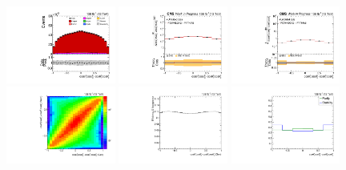 \begin{refsection}
\clearpage
\begin{figure}[htb]
\begin{center}
 \includegraphics[width=0.32\textwidth]{fig_fullRun2UL/controlplots/combined/Hyp_LLBarCMnk.pdf}
 \includegraphics[width=0.32\textwidth]{fig_fullRun2UL/unfolding/combined/UnfoldedResults_c_Mnk.pdf}
 \includegraphics[width=0.32\textwidth]{fig_fullRun2UL/unfolding/combined/UnfoldedResultsNorm_c_Mnk.pdf} \\
 \includegraphics[width=0.32\textwidth]{fig_fullRun2UL/unfolding/combined/ResponseMatrix_c_Mnk.pdf}
 \includegraphics[width=0.32\textwidth]{fig_fullRun2UL/unfolding/combined/TotEff_c_Mnk.pdf}
 \includegraphics[width=0.32\textwidth]{fig_fullRun2UL/unfolding/combined/PurStab_c_Mnk.pdf} \\

\end{center}
\end{figure}
\end{refsection}
